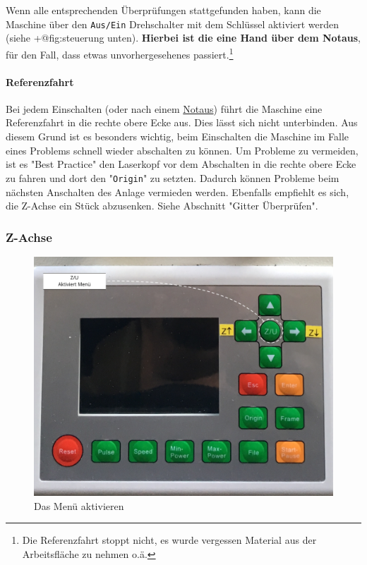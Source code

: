 \documentclass[]{article}
\let\oldparagraph\paragraph
\renewcommand{\paragraph}[1]{\oldparagraph{#1}\mbox{}}
\begin{document}
Wenn alle entsprechenden Überprüfungen stattgefunden haben, kann die
Maschine über den \texttt{Aus/Ein} Drehschalter mit dem Schlüssel
aktiviert werden (siehe +@fig:steuerung unten). \textbf{Hierbei ist die
eine Hand über dem Notaus}, für den Fall, dass etwas unvorhergesehenes
passiert.\footnote{Die Referenzfahrt stoppt nicht, es wurde vergessen
  Material aus der Arbeitsfläche zu nehmen o.ä.}

\hypertarget{referenzfahrt}{%
\paragraph{Referenzfahrt}\label{referenzfahrt}}

Bei jedem Einschalten (oder nach einem
\protect\hyperlink{notaus}{Notaus}) führt die Maschine eine
Referenzfahrt in die rechte obere Ecke aus. Dies lässt sich nicht
unterbinden. Aus diesem Grund ist es besonders wichtig, beim Einschalten
die Maschine im Falle eines Problems schnell wieder abschalten zu
können. Um Probleme zu vermeiden, ist es "Best Practice" den Laserkopf
vor dem Abschalten in die rechte obere Ecke zu fahren und dort den
"\texttt{Origin}" zu setzten. Dadurch können Probleme beim nächsten
Anschalten des Anlage vermieden werden. Ebenfalls empfiehlt es sich, die
Z-Achse ein Stück abzusenken. Siehe Abschnitt "Gitter Überprüfen".

\hypertarget{z-achse}{%
\subsubsection{Z-Achse}\label{z-achse}}

\begin{figure}
\hypertarget{fig:menu}{%
\centering
\includegraphics{assets/images/laser-menue.png}
\caption{Das Menü aktivieren}\label{fig:menu}
}
\end{figure}
\end{document}

